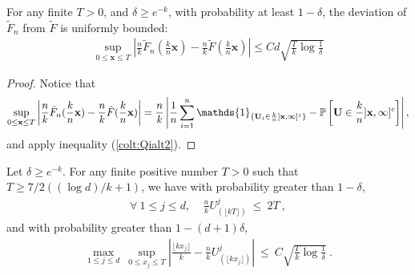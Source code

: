 \begin{lemma}
\label{colt:Fn-tildeF}
 For any finite  $T>0$, and $\delta\ge e^{-k}$,  with probability at least
$1-\delta$, the  deviation of $\tilde F_n$
from  $\tilde F$ is uniformly bounded: 
\begin{align*}
\sup_{0 \le \mathbf{x} \le T}  \left| \frac{n}{k} \tilde F_n(\frac{k}{n}\mathbf{x})-\frac{n}{k} \tilde F ( \frac{k}{n} \mathbf{x}) \right| \le Cd\sqrt{\frac{T}{k}\log{\frac{1}{\delta}}}
\end{align*}

\end{lemma}
\begin{proof}
Notice that 
\[\sup_{0 \le \mathbf{x} \le T} \left| 
  \frac{n}{k} \tilde F_n(\frac{k}{n}\mathbf{x})- \frac{n}{k} \tilde F
  ( \frac{k}{n} \mathbf{x}) \right| = 
\frac{n}{k} \left|
 \frac{1}{n}  \sum_{i=1}^n \mathds{1}_{\{ \mb U_i \in \frac{k}{n}
   ]\mathbf{x},\infty]^c \}} -
   \mathbb{P} \left [\mathbf{U} \in \frac{k}{n} ]\mathbf{x},\infty]^c
   \right] \right|, \] and apply
inequality (\ref{colt:Qialt2}).
\end{proof}

\begin{lemma}
\label{colt:U-x} 
Let $\delta\ge e^{-k}$. For any finite positive number $T>0$ such that $T \ge 7/2((\log d)/k + 1)$, we have with probability greater than $1 - \delta$, 
\begin{align}
\label{colt:eq-Wellner}
\forall~ 1\le j \le d,~~~~~\frac{n}{k} U_{(\lfloor kT\rfloor )}^j ~\le~ 2T~,
\end{align}
and with probability greater than $1- (d+1)\delta$, 
\begin{align*}
\max_{1 \le j \le d}~ \sup_{0 \le x_j \le T} \left| \frac{\lfloor kx_j\rfloor }{k} - \frac{n}{k} U_{(\lfloor kx_j\rfloor )}^j  \right| ~\le~ C\sqrt{\frac{T}{k}\log{\frac{1}{\delta}}}~.
\end{align*}
\end{lemma}

